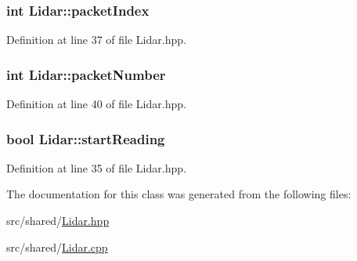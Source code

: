 \hypertarget{classLidar_a5e06436eae4b2d150501df175ec04758}{
\subsubsection[{packet\-Index}]{\setlength{\rightskip}{0pt plus 5cm}int Lidar\-::packet\-Index\hspace{0.3cm}{\ttfamily [private]}}}\label{classLidar_a5e06436eae4b2d150501df175ec04758}


Definition at line 37 of file Lidar.\-hpp.

\hypertarget{classLidar_abcca8f7f6c4cff325e6b225ddbe14796}{
\subsubsection[{packet\-Number}]{\setlength{\rightskip}{0pt plus 5cm}int Lidar\-::packet\-Number\hspace{0.3cm}{\ttfamily [private]}}}\label{classLidar_abcca8f7f6c4cff325e6b225ddbe14796}


Definition at line 40 of file Lidar.\-hpp.

\hypertarget{classLidar_a69b0909cc44f4e4e155d0ae2aa4ef3b4}{
\subsubsection[{start\-Reading}]{\setlength{\rightskip}{0pt plus 5cm}bool Lidar\-::start\-Reading\hspace{0.3cm}{\ttfamily [private]}}}\label{classLidar_a69b0909cc44f4e4e155d0ae2aa4ef3b4}


Definition at line 35 of file Lidar.\-hpp.



The documentation for this class was generated from the following files\-:\begin{DoxyCompactItemize}
\item 
src/shared/\hyperlink{Lidar_8hpp}{Lidar.\-hpp}\item 
src/shared/\hyperlink{Lidar_8cpp}{Lidar.\-cpp}\end{DoxyCompactItemize}
